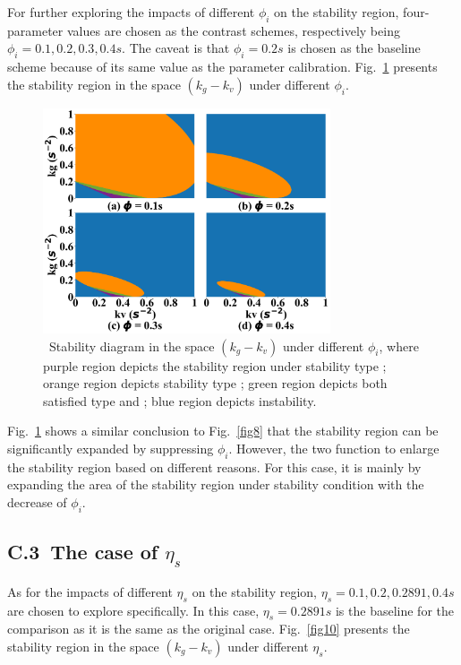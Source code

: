 \documentclass[journal]{IEEEtran}
\begin{document}
For further exploring the impacts of different $\phi_i$ on the stability region, four-parameter values are chosen as the contrast schemes, respectively being $\phi_i=0.1,0.2,0.3,0.4s$. The caveat is that $\phi_i=0.2s$ is chosen as the baseline scheme because of its same value as the parameter calibration. Fig.~\ref{fig9} presents the stability region in the space $(k_g-k_v)$ under different $\phi_i$.

\begin{figure}
  \centering
  \includegraphics[width=8.5cm]{figs/fig9.png}
  \caption{~Stability diagram in the space $(k_g-k_v)$ under different $\phi_i$, where purple region depicts the stability region under stability type \uppercase\expandafter{}; orange region depicts stability type \uppercase\expandafter{}; green region depicts both satisfied type \uppercase\expandafter{} and \uppercase\expandafter{}; blue region depicts instability.}
  \label{fig9}
\end{figure}

Fig.~\ref{fig9} shows a similar conclusion to Fig.~\ref{fig8} that the stability region can be significantly expanded by suppressing $\phi_i$. However, the two function to enlarge the stability region based on different reasons. For this case, it is mainly by expanding the area of the stability region under stability condition \uppercase\expandafter{} with the decrease of $\phi_i$.

\subsection*{C.3~The case of $\eta_s$}

As for the impacts of different $\eta_s$ on the stability region, $\eta_s=0.1,0.2,0.2891,0.4s$ are chosen to explore specifically. In this case, $\eta_s=0.2891s$ is the baseline for the comparison as it is the same as the original case. Fig.~\ref{fig10} presents the stability region in the space $(k_g-k_v)$ under different $\eta_s$.
\end{document}
